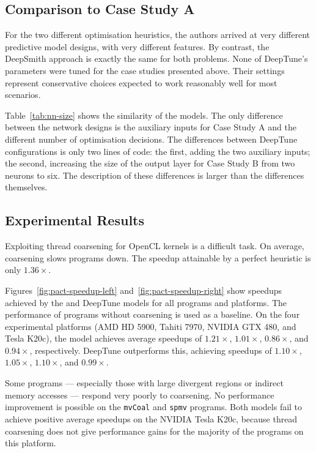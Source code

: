 \subsection{Comparison to Case Study A}

For the two different optimisation heuristics, the authors arrived at very different predictive model designs, with very different features. By contrast, the DeepSmith approach is exactly the same for both problems. None of DeepTune's parameters were tuned for the case studies presented above. Their settings represent conservative choices expected to work reasonably well for most scenarios.

Table~\ref{tab:nn-size} shows the similarity of the models. The only difference between the network designs is the auxiliary inputs for Case Study A and the different number of optimisation decisions. The differences between DeepTune configurations is only two lines of code: the first, adding the two auxiliary inputs; the second, increasing the size of the output layer for Case Study B from two neurons to six. The description of these differences is larger than the differences themselves.




\subsection{Experimental Results}

Exploiting thread coarsening for OpenCL kernels is a difficult task. On average, coarsening slows programs down. The speedup attainable by a perfect heuristic is only $1.36\times$.

Figures~\ref{fig:pact-speedup-left} and~\ref{fig:pact-speedup-right} show speedups achieved by the \citeauthor{Magni2014} and DeepTune models for all programs and platforms. The performance of programs without coarsening is used as a baseline. On the four experimental platforms (AMD HD 5900, Tahiti 7970, NVIDIA GTX 480, and Tesla K20c), the \citeauthor{Magni2014} model achieves average speedups of $1.21\times$, $1.01\times$, $0.86\times$, and $0.94\times$, respectively. DeepTune outperforms this, achieving speedups of $1.10\times$, $1.05\times$, $1.10\times$, and $0.99\times$.

Some programs --- especially those with large divergent regions or indirect memory accesses --- respond very poorly to coarsening. No performance improvement is possible on the \texttt{mvCoal} and \texttt{spmv} programs. Both models fail to achieve positive average speedups on the NVIDIA Tesla K20c, because thread coarsening does not give performance gains for the majority of the programs on this platform.

